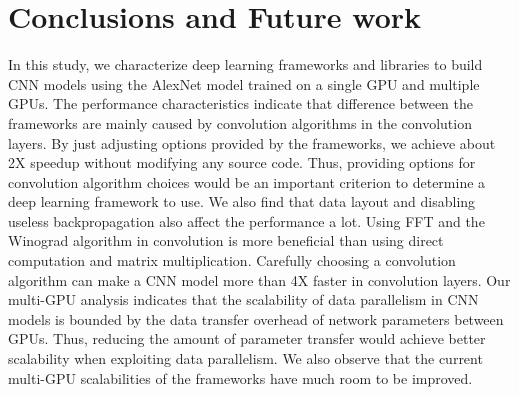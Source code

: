 \section{Conclusions and Future work}
In this study, we characterize deep learning frameworks and libraries to build CNN models using the AlexNet model trained on a single GPU and multiple GPUs. The performance characteristics indicate that difference between the frameworks are mainly caused by convolution algorithms in the convolution layers. By just adjusting options provided by the frameworks, we achieve about 2X speedup without modifying any source code. Thus, providing options for convolution algorithm choices would be an important criterion to determine a deep learning framework to use. We also find that data layout and disabling useless backpropagation also affect the performance a lot. Using FFT and the Winograd algorithm in convolution is more beneficial than using direct computation and matrix multiplication. Carefully choosing a convolution algorithm can make a CNN model more than 4X faster in convolution layers. Our multi-GPU analysis indicates that the scalability of data parallelism in CNN models is bounded by the data transfer overhead of network parameters between GPUs. Thus, reducing the amount of parameter transfer would achieve better scalability when exploiting data parallelism. We also observe that the current multi-GPU scalabilities of the frameworks have much room to be improved.